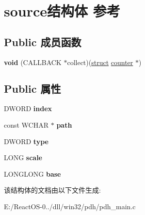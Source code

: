 \hypertarget{structsource}{}\section{source结构体 参考}
\label{structsource}
\subsection*{Public 成员函数}
\begin{DoxyCompactItemize}
\item 
\mbox{\label{structsource_a3d8359ce0a8b108822c79cff697126f9}} 
{\bfseries void} (C\+A\+L\+L\+B\+A\+CK $\ast$collect)(\hyperlink{interfacestruct}{struct} \hyperlink{structcounter}{counter} $\ast$)
\end{DoxyCompactItemize}
\subsection*{Public 属性}
\begin{DoxyCompactItemize}
\item 
\mbox{\label{structsource_a11fd171ae323bd7ab3ed561c404ff0eb}} 
D\+W\+O\+RD {\bfseries index}
\item 
\mbox{\label{structsource_a7027c0fe0c06f54d115f604d96974645}} 
const W\+C\+H\+AR $\ast$ {\bfseries path}
\item 
\mbox{\label{structsource_a63582e7efd2b83ee704497bf3d464b10}} 
D\+W\+O\+RD {\bfseries type}
\item 
\mbox{\label{structsource_aa91d916a3fb62e1f7dc9ea444b264162}} 
L\+O\+NG {\bfseries scale}
\item 
\mbox{\label{structsource_a95f3ef2a3af4dc7734b63a16839310e6}} 
L\+O\+N\+G\+L\+O\+NG {\bfseries base}
\end{DoxyCompactItemize}


该结构体的文档由以下文件生成\+:\begin{DoxyCompactItemize}
\item 
E\+:/\+React\+O\+S-\/0../dll/win32/pdh/pdh\+\_\+main.\+c\end{DoxyCompactItemize}
